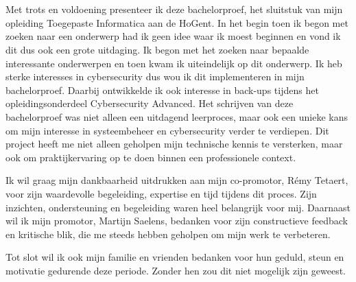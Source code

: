 
\chapter*{}%
\label{ch:voorwoord}


Met trots en voldoening presenteer ik deze bachelorproef, het sluitstuk van mijn opleiding Toegepaste Informatica aan de HoGent. In het begin toen ik begon met zoeken naar een onderwerp had ik geen idee waar ik moest beginnen en  vond ik dit dus ook een grote uitdaging. Ik begon met het zoeken naar bepaalde interessante onderwerpen en toen kwam ik uiteindelijk op dit onderwerp. Ik heb sterke interesses in cybersecurity dus  wou ik dit implementeren in mijn bachelorproef. Daarbij ontwikkelde ik ook interesse in back-ups tijdens het opleidingsonderdeel Cybersecurity Advanced. Het schrijven van deze bachelorproef was niet alleen een uitdagend leerproces, maar ook een unieke kans om mijn interesse in systeembeheer en cybersecurity verder te verdiepen. Dit project heeft me niet alleen geholpen mijn technische kennis te versterken, maar ook om praktijkervaring op te doen binnen een professionele context.

Ik wil graag mijn dankbaarheid uitdrukken aan mijn co-promotor, Rémy Tetaert, voor zijn waardevolle begeleiding, expertise en tijd tijdens dit proces. Zijn inzichten, ondersteuning en begeleiding waren heel belangrijk voor mij. Daarnaast wil ik mijn promotor, Martijn Saelens, bedanken voor zijn constructieve feedback en kritische blik, die me steeds hebben geholpen om mijn werk te verbeteren. 

Tot slot wil ik ook mijn familie en vrienden bedanken voor hun geduld, steun en motivatie gedurende deze periode. Zonder hen zou dit niet mogelijk zijn geweest.

